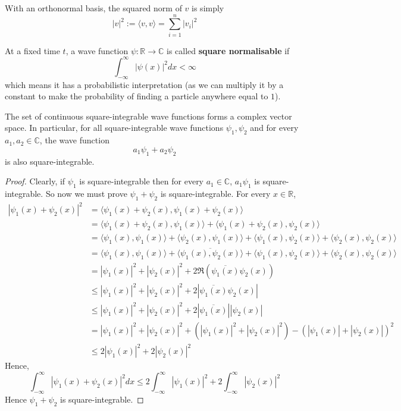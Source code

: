 \begin{remark}
	With an orthonormal basis, the squared norm of $v$ is simply
	\[
		|v|^2 := \langle v, v \rangle = \sum_{i = 1}^{n} |v_i|^2
	\]
\end{remark}

\begin{definition}
	At a fixed time $t$, a wave function $\psi: \mathbb{R} \rightarrow \mathbb{C}$ is called \textbf{square normalisable} if
	\[
		\int_{-\infty}^{\infty} |\psi(x)|^2 dx < \infty
	\]
	which means it has a probabilistic interpretation (as we can multiply it by a constant to make the probability of finding a particle anywhere equal to $1$).
\end{definition}

\begin{proposition}
	The set of continuous square-integrable wave functions forms a complex vector space. In particular, for all square-integrable wave functions $\psi_1, \psi_2$ and for every $a_1, a_2 \in \mathbb{C}$, the wave function
	\[
		a_1 \psi_1 + a_2 \psi_2
	\]
	is also square-integrable.
\end{proposition}

\begin{proof}
	Clearly, if $\psi_1$ is square-integrable then for every $a_1 \in \mathbb{C}$, $a_1 \psi_1$ is square-integrable. So now we must prove $\psi_1 + \psi_2$ is square-integrable. For every $x \in \mathbb{R}$,
	\[
		\begin{aligned}
			|\psi_1(x) + \psi_2(x)|^2
				& = \langle \psi_1(x) + \psi_2(x), \psi_1(x) + \psi_2(x) \rangle \\
				& = \langle \psi_1(x) + \psi_2(x), \psi_1(x) \rangle + \langle \psi_1(x) + \psi_2(x), \psi_2(x) \rangle \\
				& = \langle \psi_1(x), \psi_1(x) \rangle + \langle \psi_2(x), \psi_1(x) \rangle + \langle \psi_1(x), \psi_2(x) \rangle + \langle \psi_2(x), \psi_2(x) \rangle \\
				& = \langle \psi_1(x), \psi_1(x) \rangle + \overline{\langle \psi_1(x), \psi_2(x) \rangle} + \langle \psi_1(x), \psi_2(x) \rangle + \langle \psi_2(x), \psi_2(x) \rangle \\
				& = |\psi_1(x)|^2 + |\psi_2(x)|^2 + 2 \Re(\overline{\psi_1(x)} \psi_2(x)) \\
				& \le |\psi_1(x)|^2 + |\psi_2(x)|^2 + 2 |\overline{\psi_1(x)} \psi_2(x)| \\
				& \le |\psi_1(x)|^2 + |\psi_2(x)|^2 + 2 |\overline{\psi_1(x)}| |\psi_2(x)| \\
				& = |\psi_1(x)|^2 + |\psi_2(x)|^2 + (|\psi_1(x)|^2 + |\psi_2(x)|^2) - {(|\psi_1(x)| + |\psi_2(x)|)}^2 \\
				& \le 2 |\psi_1(x)|^2 + 2 |\psi_2(x)|^2
		\end{aligned}
	\]
	Hence,
	\[
		\int_{-\infty}^{\infty} |\psi_1(x) + \psi_2(x)|^2 dx \le 2 \int_{-\infty}^{\infty} |\psi_1(x)|^2 + 2 \int_{-\infty}^{\infty} |\psi_2(x)|^2
	\]
	Hence $\psi_1 + \psi_2$ is square-integrable.
\end{proof}

